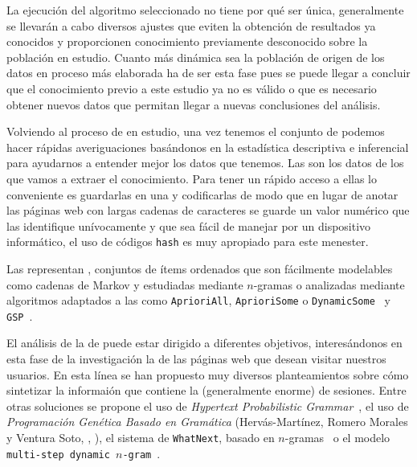 La ejecución del algoritmo seleccionado no tiene por qué ser única, generalmente se llevarán a cabo diversos ajustes que eviten la obtención de resultados ya conocidos y proporcionen conocimiento previamente desconocido sobre la población en estudio. Cuanto más dinámica sea la población de origen de los datos en proceso más elaborada ha de ser esta fase pues se puede llegar a concluir que el conocimiento previo a este estudio ya no es válido o que es necesario obtener nuevos datos que permitan llegar a nuevas conclusiones del análisis.

Volviendo al proceso de \wum en estudio, una vez tenemos el conjunto de \sns podemos hacer rápidas averiguaciones basándonos en la estadística descriptiva e inferencial para ayudarnos a entender mejor los datos que tenemos. Las \sns son los datos de los que vamos a extraer el conocimiento. Para tener un rápido acceso a ellas lo conveniente es guardarlas en una \db y codificarlas de modo que en lugar de anotar las páginas web con largas cadenas de caracteres se guarde un valor numérico que las identifique unívocamente y que sea fácil de manejar por un dispositivo informático, el uso de códigos \texttt{hash} es muy apropiado para este menester.

Las \sns representan \secuencias, conjuntos de ítems ordenados que son fácilmente modelables como cadenas de Markov y estudiadas mediante $n$-gramas o analizadas mediante algoritmos adaptados a las \secuencias como \texttt{AprioriAll}, \texttt{AprioriSome} o \texttt{DynamicSome}~\citep{AgrawalSrikant-MiningSequentialPatterns-1995} y \texttt{GSP}~\citep{SrikantAgrawal-MiningSequentialPatternsGeneralizationsAndPerformandeImprovements-1996}. 

El análisis de la \DB de \sns puede estar dirigido a diferentes objetivos, interesándonos en esta fase de la investigación la \prediccion de las páginas web que desean visitar nuestros usuarios. En esta línea se han propuesto muy diversos planteamientos sobre cómo sintetizar la informaión que contiene la (generalmente enorme) \db de sesiones. Entre otras soluciones se propone el uso de \emph{Hypertext Probabilistic Grammar}~\citep{BorgesLevene-DataMiningOfUserNavigationPatterns-1999}, el uso de \emph{Programación Genética Basado en Gramática} (Hervás-Martínez, Romero
Morales y Ventura Soto, \cite*{HervasRomeroVentura-ComparacionMedidasRA-2004}, \cite*{HervasRomeroVentura-SeleccionMedidasEvaluacionReglas-2004}), el sistema de \prediccion \texttt{WhatNext}, basado en $n$-gramas~\citep{SuYangLuZhang-WhatNext-2000} o el modelo \texttt{multi-step dynamic $n$-gram}~\citep{SunChenWenyinMa-IntentionModelingForWebNavigation-2002}.

